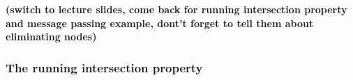 \begin{frame} 
\textbf{(switch to lecture slides, come back for running intersection property and message passing example, dont't forget to tell them about eliminating nodes)}
\end{frame}


\subsubsection{The running intersection property}

